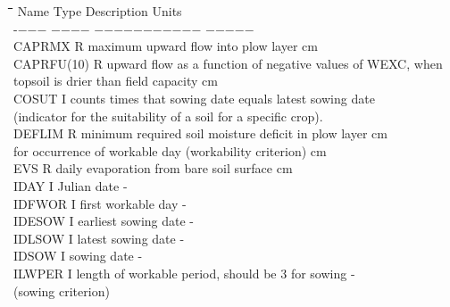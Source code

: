 \documentclass[11pt]{article}
\begin{document}
\begin{tabbing}
\hspace{1.27cm}\=\hspace{1.27cm}\=\hspace{1.27cm}\=\hspace{1.27cm}\=%
\hspace{1.27cm}\=\hspace{1.27cm}\=\hspace{1.27cm}\=\hspace{1.27cm}\=%
\hspace{1.27cm}\=\hspace{1.27cm}\=\kill
Name    \> \> Type   \> Description                                        \> \> \> \> \> \> \> Units\\
-$-$$-$$-$    \> \> $-$$-$$-$$-$   \> $-$$-$$-$$-$$-$$-$$-$$-$$-$$-$$-$                                       \> \> \> \> \> \> \> $-$$-$$-$$-$$-$\\
CAPRMX     \> \> R\> maximum upward flow into plow layer\> \> \> \> \> \> \> cm \\
CAPRFU(10) \> \> R\> upward flow as a function of negative values of WEXC, when\\
\>\> \> topsoil is drier than field capacity\> \> \> \> \> \> \> cm \\
COSUT      \> \> I\> counts times that sowing date equals latest sowing date\\
\>\> \> (indicator for the suitability of a soil for a specific crop).\\
DEFLIM     \> \> R\> minimum required soil moisture deficit in plow layer\> \> \> \> \> \> \> cm\\
          \>\> \> for occurrence of workable day (workability criterion)\> \> \> \> \> \> \> cm\\
EVS\> \> R\> daily evaporation from bare soil surface\> \> \> \> \> \> \> cm\\
IDAY\> \> I\> Julian date\> \> \> \> \> \> \> -\\
IDFWOR\> \> I\> first workable day\> \> \> \> \> \> \> -\\
IDESOW\> \> I\> earliest sowing date\> \> \> \> \> \> \> -\\
IDLSOW\> \> I\> latest sowing date\> \> \> \> \> \> \> -\\
IDSOW\> \> I\> sowing date\> \> \> \> \> \> \> -\\
ILWPER\> \> I\> length of workable period, should be 3 for sowing\> \> \> \> \> \> \> -\\
\>\> \> (sowing criterion)\\
$$
\end{tabbing}
\end{document}
